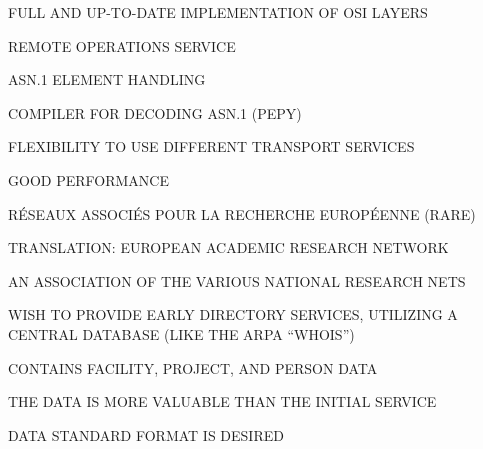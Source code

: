 \begin{bwslide}

\begin{nrtc}
\item	FULL AND UP-TO-DATE IMPLEMENTATION OF OSI LAYERS

\item	REMOTE OPERATIONS SERVICE

\item	ASN.1 ELEMENT HANDLING

\item	COMPILER FOR DECODING ASN.1 (PEPY)

\item	FLEXIBILITY TO USE DIFFERENT TRANSPORT SERVICES

\item	GOOD PERFORMANCE
\end{nrtc}
\end{bwslide}


\begin{bwslide}

\begin{nrtc}
\item	R\'{E}SEAUX ASSOCI\'{E}S POUR LA RECHERCHE EUROP\'{E}ENNE (RARE)

\item	TRANSLATION: EUROPEAN ACADEMIC RESEARCH NETWORK

\item	AN ASSOCIATION OF THE VARIOUS NATIONAL RESEARCH NETS

\item	WISH TO PROVIDE EARLY DIRECTORY SERVICES, UTILIZING
	A CENTRAL DATABASE (LIKE THE ARPA ``WHOIS'')

\item	CONTAINS FACILITY, PROJECT, AND PERSON DATA

\item	THE DATA IS MORE VALUABLE THAN THE INITIAL SERVICE

\item	DATA STANDARD FORMAT IS DESIRED
\end{nrtc}
\end{bwslide}


